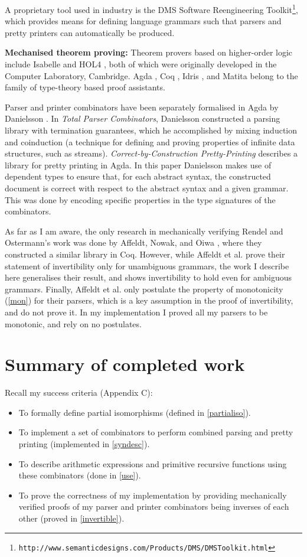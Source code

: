 \documentclass[12pt,a4paper,twoside,openright]{report}
\begin{document}
A proprietary tool used in industry is the DMS Software Reengineering Toolkit\footnote{\tt http://www.semanticdesigns.com/Products/DMS/DMSToolkit.html}, which provides means for defining language grammars such that parsers and pretty printers can automatically be produced.

{\bf Mechanised theorem proving:} Theorem provers based on higher-order logic include Isabelle \cite{isabelle} and HOL4 \cite{hol4}, both of which were originally developed in the Computer Laboratory, Cambridge. Agda \cite{agda}, Coq \cite{coq}, Idris \cite{idris}, and Matita \cite{matita} belong to the family of type-theory based proof assistants.

Parser and printer combinators have been separately formalised in Agda by Danielsson \cite{nad-parse}\cite{nad-print}. In \emph{Total Parser Combinators}, Danielsson constructed a parsing library with termination guarantees, which he accomplished by mixing induction and coinduction (a technique for defining and proving properties of infinite data structures, such as streams). \emph{Correct-by-Construction Pretty-Printing} describes a library for pretty printing in Agda. In this paper Danielsson makes use of dependent types to ensure that, for each abstract syntax, the constructed document is correct with respect to the abstract syntax and a given grammar. This was done by encoding specific properties in the type signatures of the combinators.

As far as I am aware, the only research in mechanically verifying Rendel and Ostermann's work was done by Affeldt, Nowak, and Oiwa \cite{coq-invert}, where they constructed a similar library in Coq. However, while Affeldt et al. prove their statement of invertibility only for unambiguous grammars, the work I describe here generalises their result, and shows invertibility to hold even for ambiguous grammars. Finally, Affeldt et al. only postulate the property of monotonicity (\autoref{mon}) for their parsers, which is a key assumption in the proof of invertibility, and do not prove it. In my implementation I proved all my parsers to be monotonic, and rely on no postulates.

\section{Summary of completed work}

Recall my success criteria (Appendix C):
\begin{itemize}
\item To formally define partial isomorphisms (defined in \autoref{partialiso}).
\item To implement a set of combinators to perform combined parsing and pretty printing (implemented in \autoref{syndesc}).
\item To describe arithmetic expressions and primitive recursive functions using these combinators (done in \autoref{use}).
\item To prove the correctness of my implementation by providing mechanically verified proofs of my parser and printer combinators being inverses of each other (proved in \autoref{invertible}).
\end{itemize}
\end{document}

